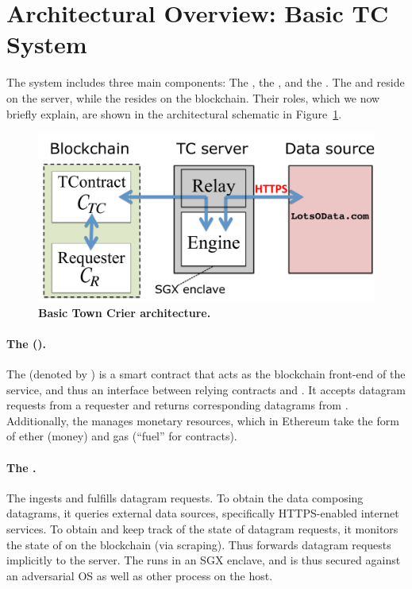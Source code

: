 \section{Architectural Overview: Basic TC System}

The \tcs system includes three main components: The \tcontract, the \encname, and the \medname. The \encname and \medname reside on the \tc server, while the \tcontract resides on the blockchain. Their roles, which we now briefly explain, are shown in the architectural schematic in Figure~\ref{fig:overview}.

\vspace{-2mm}
\begin{figure}[h!]
\centering
\includegraphics[width=\columnwidth]{OverviewFig}
\caption{{\bf Basic Town Crier architecture.}}
\label{fig:overview}
\end{figure}
\vspace{-2mm}

\paragraph{The \tcontract (\tcont).} The \tcontract (denoted by \tcont) is a smart contract that acts as the blockchain front-end of the \tc service, and thus an interface between relying contracts and \tc. It accepts datagram requests from a requester \reqcont and returns corresponding datagrams from \tc. Additionally, the \tcontract manages \tc monetary resources, which in Ethereum take the form of ether (money) and gas (``fuel'' for contracts). 

\paragraph{The \encname.}
The \encname ingests and fulfills datagram requests. To obtain the data composing datagrams, it queries external data sources, specifically HTTPS-enabled internet services. To obtain and keep track of the state of datagram requests, it monitors the state of \tcontract on the blockchain (via scraping). Thus \tcontract forwards datagram requests implicitly to the \tc server. The \encname runs in an SGX enclave, and is thus secured against an adversarial OS as well as other process on the host. 

